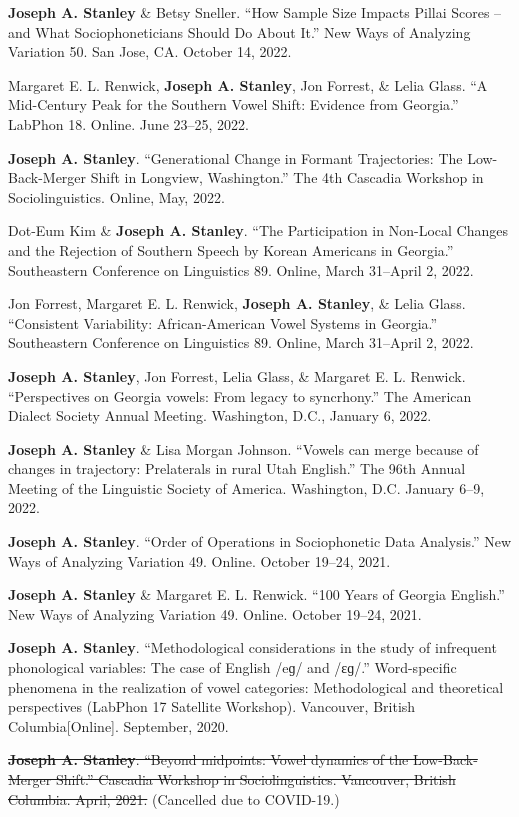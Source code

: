 \documentclass[
]{article}
\begin{document}
\textbf{Joseph A. Stanley} \& Betsy Sneller. ``How Sample Size Impacts
Pillai Scores -- and What Sociophoneticians Should Do About It.'' New
Ways of Analyzing Variation 50. San Jose, CA. October 14, 2022.

Margaret E. L. Renwick, \textbf{Joseph A. Stanley}, Jon Forrest, \&
Lelia Glass. ``A Mid-Century Peak for the Southern Vowel Shift: Evidence
from Georgia.'' LabPhon 18. Online. June 23--25, 2022.

\textbf{Joseph A. Stanley}. ``Generational Change in Formant
Trajectories: The Low-Back-Merger Shift in Longview, Washington.'' The
4th Cascadia Workshop in Sociolinguistics. Online, May, 2022.

Dot-Eum Kim \& \textbf{Joseph A. Stanley}. ``The Participation in
Non-Local Changes and the Rejection of Southern Speech by Korean
Americans in Georgia.'' Southeastern Conference on Linguistics 89.
Online, March 31--April 2, 2022.

Jon Forrest, Margaret E. L. Renwick, \textbf{Joseph A. Stanley}, \&
Lelia Glass. ``Consistent Variability: African-American Vowel Systems in
Georgia.'' Southeastern Conference on Linguistics 89. Online, March
31--April 2, 2022.

\textbf{Joseph A. Stanley}, Jon Forrest, Lelia Glass, \& Margaret E. L.
Renwick. ``Perspectives on Georgia vowels: From legacy to syncrhony.''
The American Dialect Society Annual Meeting. Washington, D.C., January
6, 2022.

\textbf{Joseph A. Stanley} \& Lisa Morgan Johnson. ``Vowels can merge
because of changes in trajectory: Prelaterals in rural Utah English.''
The 96th Annual Meeting of the Linguistic Society of America.
Washington, D.C. January 6--9, 2022.

\textbf{Joseph A. Stanley}. ``Order of Operations in Sociophonetic Data
Analysis.'' New Ways of Analyzing Variation 49. Online. October 19--24,
2021.

\textbf{Joseph A. Stanley} \& Margaret E. L. Renwick. ``100 Years of
Georgia English.'' New Ways of Analyzing Variation 49. Online. October
19--24, 2021.

\textbf{Joseph A. Stanley}. ``Methodological considerations in the study
of infrequent phonological variables: The case of English /eɡ/ and
/ɛɡ/.'' Word-specific phenomena in the realization of vowel categories:
Methodological and theoretical perspectives (LabPhon 17 Satellite
Workshop). Vancouver, British Columbia{[}Online{]}. September, 2020.

\st{\textbf{Joseph A. Stanley}. ``Beyond midpoints: Vowel dynamics of
the Low-Back-Merger Shift.'' Cascadia Workshop in Sociolinguistics.
Vancouver, British Columbia. April, 2021.} (Cancelled due to COVID-19.)
\end{document}
